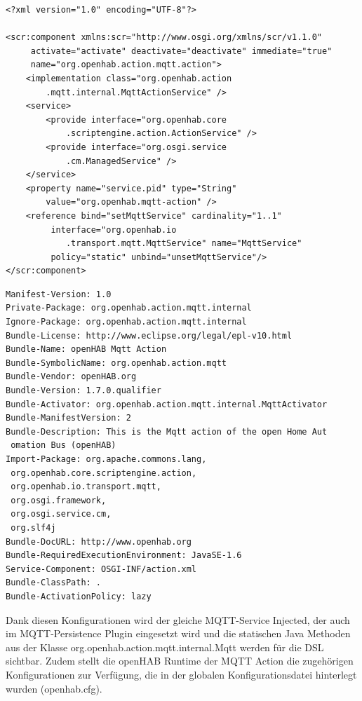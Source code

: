\begin{lstlisting}[style=csharp, caption=OSGI-INF/action.xml]
<?xml version="1.0" encoding="UTF-8"?>

<scr:component xmlns:scr="http://www.osgi.org/xmlns/scr/v1.1.0"
     activate="activate" deactivate="deactivate" immediate="true"
     name="org.openhab.action.mqtt.action">
	<implementation class="org.openhab.action
		.mqtt.internal.MqttActionService" />
	<service>
		<provide interface="org.openhab.core
			.scriptengine.action.ActionService" />
		<provide interface="org.osgi.service
			.cm.ManagedService" />
	</service>
	<property name="service.pid" type="String" 
		value="org.openhab.mqtt-action" />
	<reference bind="setMqttService" cardinality="1..1"
	     interface="org.openhab.io
	     	.transport.mqtt.MqttService" name="MqttService"
	     policy="static" unbind="unsetMqttService"/>	
</scr:component>

\end{lstlisting}

\begin{lstlisting}[style=csharp, caption=META-INF/MANIFEST.MF]
Manifest-Version: 1.0
Private-Package: org.openhab.action.mqtt.internal
Ignore-Package: org.openhab.action.mqtt.internal
Bundle-License: http://www.eclipse.org/legal/epl-v10.html
Bundle-Name: openHAB Mqtt Action
Bundle-SymbolicName: org.openhab.action.mqtt
Bundle-Vendor: openHAB.org
Bundle-Version: 1.7.0.qualifier
Bundle-Activator: org.openhab.action.mqtt.internal.MqttActivator
Bundle-ManifestVersion: 2
Bundle-Description: This is the Mqtt action of the open Home Aut
 omation Bus (openHAB)
Import-Package: org.apache.commons.lang,
 org.openhab.core.scriptengine.action,
 org.openhab.io.transport.mqtt,
 org.osgi.framework,
 org.osgi.service.cm,
 org.slf4j
Bundle-DocURL: http://www.openhab.org
Bundle-RequiredExecutionEnvironment: JavaSE-1.6
Service-Component: OSGI-INF/action.xml
Bundle-ClassPath: .
Bundle-ActivationPolicy: lazy

\end{lstlisting}

Dank diesen Konfigurationen wird der gleiche MQTT-Service Injected, der auch im MQTT-Persistence Plugin eingesetzt wird und die statischen Java Methoden aus der Klasse org.openhab.action.mqtt.internal.Mqtt werden für die DSL sichtbar. Zudem stellt die openHAB Runtime der MQTT Action die zugehörigen Konfigurationen zur Verfügung, die in der globalen Konfigurationsdatei hinterlegt wurden (openhab.cfg).\\ \\

